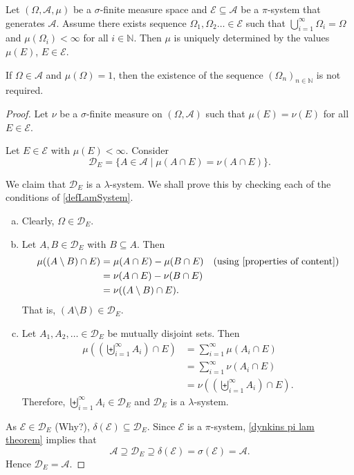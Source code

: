 \begin{lemma}
\label{uniquely defined by base pi sys}
    Let $(\Omega,\mathcal{A},\mu)$ be a $\sigma$-finite measure space and $\mathcal{E}\subseteq\mathcal{A}$ be a $\pi$-system that generates $\mathcal{A}$. Assume there exists sequence $\Omega_1,\Omega_2\ldots\in\mathcal{E}$ such that $\bigcup_{i=1}^\infty\Omega_i=\Omega$ and $\mu(\Omega_i)<\infty$ for all $i\in\mathbb{N}$. Then $\mu$ is uniquely determined by the values $\mu(E)$, $E\in\mathcal{E}$.
    
    If $\Omega\in\mathcal{A}$ and $\mu(\Omega)=1$, then the existence of the sequence $(\Omega_n)_{n\in\mathbb{N}}$ is not required.
\end{lemma}
\begin{proof}
    Let $\nu$ be a $\sigma$-finite measure on $(\Omega,\mathcal{A})$ such that $\mu(E)=\nu(E)$ for all $E\in\mathcal{E}$.
    
    \vspace{1mm}
    Let $E\in\mathcal{E}$ with $\mu(E)<\infty$. Consider
    $$\mathcal{D}_E=\{A\in\mathcal{A}\mid \mu(A\cap E)=\nu(A\cap E)\}.$$
    
    We claim that $\mathcal{D}_E$ is a $\lambda$-system. We shall prove this by checking each of the conditions of \ref{defLamSystem}.
    
    \begin{enumerate}[(a)]
        \item Clearly, $\Omega\in\mathcal{D}_E$.
        \item Let $A,B\in\mathcal{D}_E$ with $B\subseteq A$. Then
        \begin{align*}
            \mu((A\setminus B)\cap E) &= \mu(A\cap E) - \mu(B\cap E)\quad\text{(using \ref{properties of content})} \\
            &= \nu(A\cap E) - \nu(B\cap E) \\
            &= \nu((A\setminus B)\cap E).
        \end{align*}
        That is, $(A\setminus B)\in\mathcal{D}_E$.
        \item Let $A_1,A_2,\ldots\in\mathcal{D}_E$ be mutually disjoint sets. Then
        \begin{align*}
            \mu\left(\left(\biguplus_{i=1}^\infty A_i\right)\cap E\right) &= \sum_{i=1}^\infty \mu(A_i\cap E) \\
            &= \sum_{i=1}^\infty\nu(A_i\cap E) \\
            &= \nu\left(\left(\biguplus_{i=1}^\infty A_i\right)\cap E\right).
        \end{align*}
        Therefore, $\biguplus_{i=1}^\infty A_i\in\mathcal{D}_E$ and $\mathcal{D}_E$ is a $\lambda$-system.
    \end{enumerate}
    As $\mathcal{E}\in\mathcal{D}_E$ (Why?), $\delta(\mathcal{E})\subseteq\mathcal{D}_E$. Since $\mathcal{E}$ is a $\pi$-system, \ref{dynkins pi lam theorem} implies that
    $$\mathcal{A}\supseteq\mathcal{D}_E\supseteq\delta(\mathcal{E})=\sigma(\mathcal{E})=\mathcal{A}.$$
    Hence $\mathcal{D}_E=\mathcal{A}$.
    

\end{proof}
